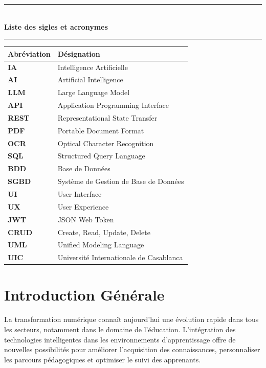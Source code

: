 \documentclass[12pt,a4paper]{report}
\newcommand{\fronttitle}[1]{
\begin{center}
{\color{learnixblue}\rule{0.35\textwidth}{1pt}}\\[0.4cm]
{\fontsize{20}{24}\selectfont\bfseries\color{learnixdark} #1}\\[0.2cm]
{\color{learnixblue}\rule{0.18\textwidth}{1pt}}
\end{center}
}
\begin{document}
\clearpage
\thispagestyle{plain}

\fronttitle{Liste des sigles et acronymes}

\vspace{1cm}

\begin{center}
\begin{tabular}{|>{\bfseries}m{4cm}|m{9cm}|}
\hline
Abréviation & Désignation \\
\hline
IA & Intelligence Artificielle \\
\hline
AI & Artificial Intelligence \\
\hline
LLM & Large Language Model \\
\hline
API & Application Programming Interface \\
\hline
REST & Representational State Transfer \\
\hline
PDF & Portable Document Format \\
\hline
OCR & Optical Character Recognition \\
\hline
SQL & Structured Query Language \\
\hline
BDD & Base de Données \\
\hline
SGBD & Système de Gestion de Base de Données \\
\hline
UI & User Interface \\
\hline
UX & User Experience \\
\hline
JWT & JSON Web Token \\
\hline
CRUD & Create, Read, Update, Delete \\
\hline
UML & Unified Modeling Language \\
\hline
UIC & Université Internationale de Casablanca \\
\hline
\end{tabular}
\end{center}

\clearpage
\tableofcontents


\clearpage

\chapter*{Introduction Générale}

La transformation numérique connaît aujourd'hui une évolution rapide dans tous
les secteurs, notamment dans le domaine de l'éducation. L'intégration des
technologies intelligentes dans les environnements d'apprentissage offre de
nouvelles possibilités pour améliorer l'acquisition des connaissances,
personnaliser les parcours pédagogiques et optimiser le suivi des apprenants.
\end{document}
